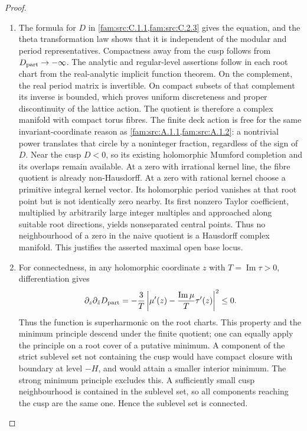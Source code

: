 \begin{proof}
\begin{enumerate}[label=\arabic*.,leftmargin=*]
\item The formula for \(D\) in \cref{fam:src:C.1.1,fam:src:C.2.3} gives the equation, and the theta
transformation law shows that it is independent of the modular and
period representatives. Compactness away from the cusp follows from
\(D_{\rm part}\to-\infty\). The analytic and regular-level
assertions follow in each root chart from the real-analytic implicit
function theorem. On the complement, the real period matrix is
invertible. On compact subsets of that complement its inverse is
bounded, which proves uniform discreteness and proper discontinuity
of the lattice action. The quotient is therefore a complex manifold
with compact torus fibres. The finite deck action is free for the
same invariant-coordinate reason as \cref{fam:src:A.1.1,fam:src:A.1.2}: a nontrivial power translates
that circle by a noninteger fraction, regardless of the sign of
\(D\). Near the cusp \(D<0\), so its existing holomorphic Mumford
completion and its overlaps remain available.
At a zero with irrational kernel line, the fibre quotient is already
non-Hausdorff. At a zero with rational kernel choose a primitive
integral kernel vector. Its holomorphic period vanishes at that root
point but is not identically zero nearby. Its first nonzero Taylor
coefficient, multiplied by arbitrarily large integer multiples and
approached along suitable root directions, yields nonseparated
central points. Thus no neighbourhood of a zero in the naive quotient
is a Hausdorff complex manifold. This justifies the asserted maximal
open base locus.

\item For connectedness, in any holomorphic coordinate \(z\) with
\(T=\operatorname{Im}\tau>0\), differentiation gives
\[
 \partial_z\partial_{\bar z}D_{\rm part}
 =-\frac3T\left|\mu'(z)-
         \frac{\operatorname{Im}\mu}{T}\tau'(z)\right|^2\le0.
\]
Thus the function is superharmonic on the root charts. This property
and the minimum principle descend under the finite quotient; one
can equally apply the principle on a root cover of a putative
minimum. A component of the strict sublevel set not containing the
cusp would have compact closure with boundary at level \(-H\), and
would attain a smaller interior minimum. The strong minimum
principle excludes this. A sufficiently small cusp neighbourhood is
contained in the sublevel set, so all components reaching the cusp
are the same one. Hence the sublevel set is connected.
\end{enumerate}
\end{proof}

